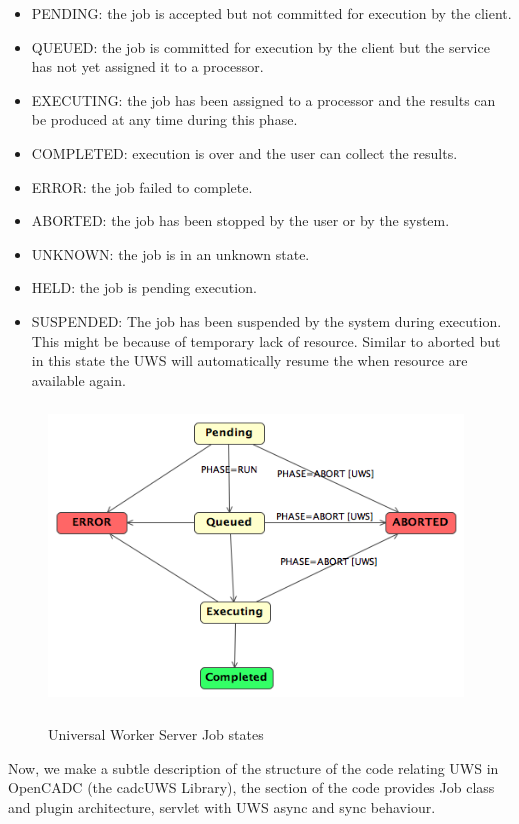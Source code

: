 \begin{itemize}

\item 
    PENDING: the job is accepted but not committed for execution by the client.
\item
    QUEUED: the job is committed for execution by the client but the service has not yet assigned it to a processor.
\item
    EXECUTING: the job has been assigned to a processor and the results can be produced at any time during this phase.
\item
    COMPLETED: execution is over and the user can collect the results.
\item
    ERROR: the job failed to complete.
\item
    ABORTED: the job has been stopped by the user or by the system.
\item
    UNKNOWN: the job is in an unknown state.
\item
    HELD: the job is pending execution.
\item
    SUSPENDED: The job has been suspended by the system during execution. This might be because of temporary lack of resource. Similar to aborted but in this state the UWS will automatically resume the when resource are available again.

\end{itemize}



\begin{figure}[H]
\centering
\includegraphics[width=11cm,height=8cm]{images/UWSStates.png}\\
\caption{Universal Worker Server Job states}
\end{figure}

Now, we make a subtle description of the structure of the code relating UWS in OpenCADC (the cadcUWS Library), the section of the code provides Job class and plugin architecture, servlet with UWS async and sync behaviour.

